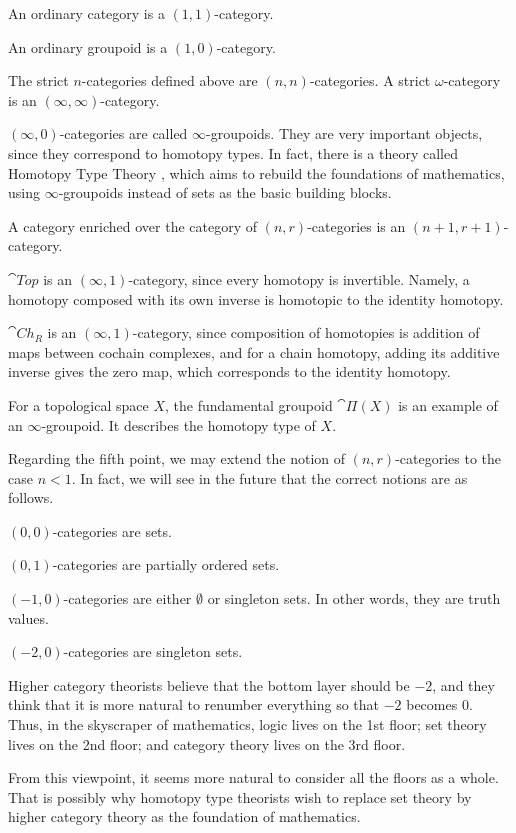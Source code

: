 \begin{itms}
    \item An ordinary category is a $(1,1)$-category.
    \item An ordinary groupoid is a $(1,0)$-category.
    \item The strict $n$-categories defined above are $(n,n)$-categories.
    A strict $\omega$-category is an $(\infty,\infty)$-category.
    \item $(\infty,0)$-categories are called $\infty$-groupoids.
    They are very important objects, since they correspond to homotopy types.
    In fact, there is a theory called Homotopy Type Theory \cite{hott},
    which aims to rebuild the foundations of mathematics,
    using $\infty$-groupoids instead of sets as the basic building blocks.
    \item A category enriched over the category of $(n,r)$-categories
    is an $(n+1,r+1)$-category.
    \item $\cat{Top}$ is an $(\infty,1)$-category,
    since every homotopy is invertible.
    Namely, a homotopy composed with its own inverse
    is homotopic to the identity homotopy.
    \item $\cat{Ch}_R$ is an $(\infty,1)$-category,
    since composition of homotopies is addition of
    maps between cochain complexes,
    and for a chain homotopy,
    adding its additive inverse gives the zero map,
    which corresponds to the identity homotopy.
    \item For a topological space $X$,
    the fundamental groupoid $\cat{Π}(X)$ is
    an example of an $\infty$-groupoid.
    It describes the homotopy type of $X$.
\end{itms}

Regarding the fifth point,
we may extend the notion of $(n,r)$-categories to the case $n<1$.
In fact, we will see in the future
that the correct notions are as follows.
\begin{itms}
    \item $(0,0)$-categories are sets.
    \item $(0,1)$-categories are partially ordered sets.
    \item $(-1,0)$-categories are either $\emptyset$ or singleton sets. In other words, they are truth values.
    \item $(-2,0)$-categories are singleton sets.
\end{itms}

Higher category theorists believe that
the bottom layer should be $-2$,
and they think that it is more natural to renumber everything
so that $-2$ becomes $0$.
Thus, in the skyscraper of mathematics,
logic lives on the 1st floor;
set theory lives on the 2nd floor;
and category theory lives on the 3rd floor.

From this viewpoint,
it seems more natural to consider all the floors as a whole.
That is possibly why homotopy type theorists wish to replace set theory by
higher category theory as the foundation of mathematics.
